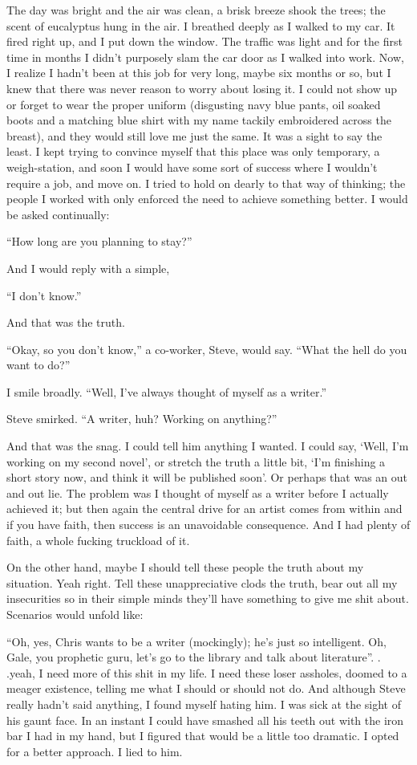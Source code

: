 The day was bright and the air was clean, a brisk breeze shook the
trees; the scent of eucalyptus hung in the air. I breathed deeply as I
walked to my car. It fired right up, and I put down the window. The
traffic was light and for the first time in months I didn't purposely
slam the car door as I walked into work. Now, I realize I hadn't been at
this job for very long, maybe six months or so, but I knew that there
was never reason to worry about losing it. I could not show up or forget
to wear the proper uniform (disgusting navy blue pants, oil soaked boots
and a matching blue shirt with my name tackily embroidered across the
breast), and they would still love me just the same. It was a sight to
say the least. I kept trying to convince myself that this place was only
temporary, a weigh-station, and soon I would have some sort of success
where I wouldn't require a job, and move on. I tried to hold on dearly
to that way of thinking; the people I worked with only enforced the need
to achieve something better. I would be asked continually:

``How long are you planning to stay?''

And I would reply with a simple,

``I don't know.''

And that was the truth.

``Okay, so you don't know,'' a co-worker, Steve, would say. ``What the
hell do you want to do?''

I smile broadly. ``Well, I've always thought of myself as a writer.''

Steve smirked. ``A writer, huh? Working on anything?''

And that was the snag. I could tell him anything I wanted. I could say,
`Well, I'm working on my second novel', or stretch the truth a little
bit, `I'm finishing a short story now, and think it will be published
soon'. Or perhaps that was an out and out lie. The problem was I thought
of myself as a writer before I actually achieved it; but then again the
central drive for an artist comes from within and if you have faith,
then success is an unavoidable consequence. And I had plenty of faith, a
whole fucking truckload of it.

On the other hand, maybe I should tell these people the truth about my
situation. Yeah right. Tell these unappreciative clods the truth, bear
out all my insecurities so in their simple minds they'll have something
to give me shit about. Scenarios would unfold like:

``Oh, yes, Chris wants to be a writer (mockingly); he's just so
intelligent. Oh, Gale, you prophetic guru, let's go to the library and
talk about literature''. . .yeah, I need more of this shit in my life. I
need these loser assholes, doomed to a meager existence, telling me what
I should or should not do. And although Steve really hadn't said
anything, I found myself hating him. I was sick at the sight of his
gaunt face. In an instant I could have smashed all his teeth out with
the iron bar I had in my hand, but I figured that would be a little too
dramatic. I opted for a better approach. I lied to him.


